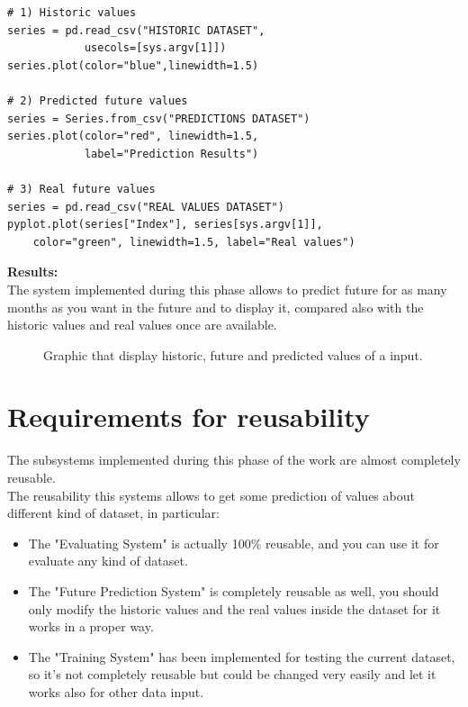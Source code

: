 \begin{lstlisting}
# 1) Historic values
series = pd.read_csv("HISTORIC DATASET", 
			usecols=[sys.argv[1]])
series.plot(color="blue",linewidth=1.5)

# 2) Predicted future values
series = Series.from_csv("PREDICTIONS DATASET")
series.plot(color="red", linewidth=1.5, 
			label="Prediction Results")

# 3) Real future values
series = pd.read_csv("REAL VALUES DATASET")
pyplot.plot(series["Index"], series[sys.argv[1]],
	color="green", linewidth=1.5, label="Real values")

\end{lstlisting}
\textbf{Results:}\\
The system implemented during this phase allows to predict future for as many months as you want in the future and to display it, compared also with the historic values and real values once are available.
\begin{figure}[H]
	\centering
    \caption{Graphic that display historic, future and predicted values of a input.}
\end{figure}

\newpage

\section{Requirements for reusability}
The subsystems implemented during this phase of the work are almost completely reusable.\\
The reusability this systems allows to get some prediction of values about different kind of dataset, in particular:
\begin{itemize}
\item The "Evaluating System" is actually 100\% reusable, and you can use it for evaluate any kind of dataset.
\item The "Future Prediction System" is completely reusable as well, you should only modify the historic values and the real values inside the dataset for it works in a proper way.
\item The "Training System" has been implemented for testing the current dataset, so it's not completely reusable but could be changed very easily and let it works also for other data input.
\end{itemize}



